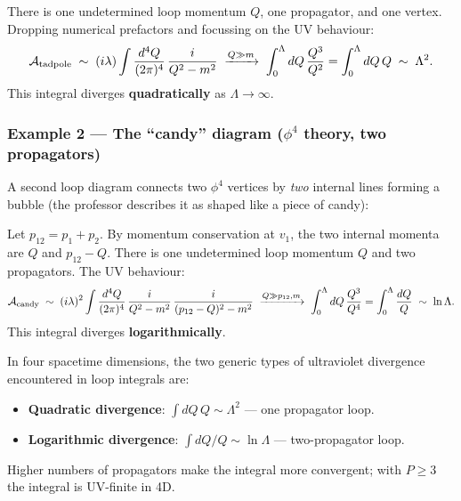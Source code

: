 \documentclass[../main.tex]{subfiles}
\begin{document}
There is one undetermined loop momentum $Q$, one propagator, and one vertex.  Dropping numerical prefactors and focussing on the UV behaviour:
\begin{equation}
  \mathcal{A}_{\rm tadpole}
  \;\sim\;
  (i\lambda)\int \frac{d^4Q}{(2\pi)^4}\,\frac{i}{Q^2 - m^2}
  \;\xrightarrow{Q\gg m}\;
  \int_0^\Lambda dQ\, \frac{Q^3}{Q^2}
  = \int_0^\Lambda dQ\, Q
  \;\sim\; \Lambda^2.
  \label{eq:lec06:tadpole}
\end{equation}
This integral diverges \textbf{quadratically} as $\Lambda\to\infty$.

\subsubsection*{Example 2 — The ``candy'' diagram ($\phi^4$ theory, two propagators)}

A second loop diagram connects two $\phi^4$ vertices by \emph{two} internal lines forming a bubble (the professor describes it as shaped like a piece of candy):

\begin{center}
\end{center}

Let $p_{12} = p_1 + p_2$.  By momentum conservation at $v_1$, the two internal momenta are $Q$ and $p_{12} - Q$.  There is one undetermined loop momentum $Q$ and two propagators.  The UV behaviour:
\begin{equation}
  \mathcal{A}_{\rm candy}
  \;\sim\;
  (i\lambda)^2 \int \frac{d^4Q}{(2\pi)^4}\,
  \frac{i}{Q^2 - m^2}\,\frac{i}{(p_{12}-Q)^2 - m^2}
  \;\xrightarrow{Q\gg p_{12},m}\;
  \int_0^\Lambda dQ\, \frac{Q^3}{Q^4}
  = \int_0^\Lambda \frac{dQ}{Q}
  \;\sim\; \ln\Lambda.
  \label{eq:lec06:candy}
\end{equation}
This integral diverges \textbf{logarithmically}.

\begin{remark}
In four spacetime dimensions, the two generic types of ultraviolet divergence encountered in loop integrals are:
\begin{itemize}
  \item \textbf{Quadratic divergence}: $\int dQ\,Q \sim \Lambda^2$ — one propagator loop.
  \item \textbf{Logarithmic divergence}: $\int dQ/Q \sim \ln\Lambda$ — two-propagator loop.
\end{itemize}
Higher numbers of propagators make the integral more convergent; with $P \geq 3$ the integral is UV-finite in 4D.
\end{remark}
\end{document}
